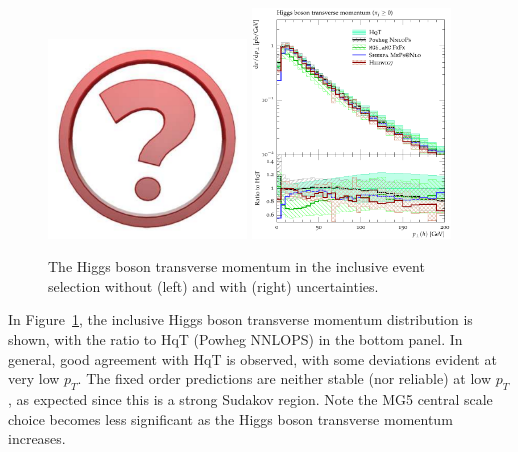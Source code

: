 
\begin{figure}[t!]
  \centering
  \includegraphics[width=0.47\textwidth]{Micon.pdf}
  \hfill
  \includegraphics[width=0.47\textwidth]{figures/hjetscomp_H_pT_incl.pdf}
  \caption{
    The Higgs boson transverse momentum in the inclusive event selection
    without (left) and with (right) uncertainties.
    \label{fig:higgscomp:results:inclobs:hpt}
  }
\end{figure}

In Figure~\ref{fig:higgscomp:results:inclobs:hpt}, the inclusive Higgs
boson transverse momentum distribution is shown, with the ratio to HqT
(Powheg NNLOPS) in the bottom panel.  In general, good agreement with
HqT is observed, with some deviations evident at very low $p_T$.  The
fixed order predictions are neither stable (nor reliable) at low
$p_T$, as expected since this is a strong Sudakov region. Note the MG5
central scale choice becomes less significant as the Higgs boson
transverse momentum increases.

